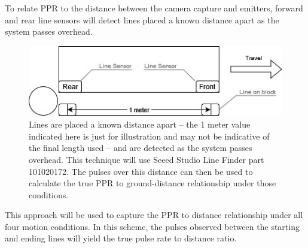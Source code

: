 \documentclass[12pt]{article}
\begin{document}
To relate PPR to the distance between the camera capture and emitters, forward and rear line sensors will detect lines placed a known distance apart as the system passes overhead.
\begin{figure}[H]
	\centering
	\includegraphics[width=0.75\linewidth]{./figures/determine-ppr-per-meter.jpg}
	\caption[Determine PPR per meter]{Lines are placed a known distance apart -- the 1 meter value indicated here is just for illustration and may not be indicative of the final length used -- and are detected as the system passes overhead. This technique will use Seeed Studio Line Finder part 101020172. The pulses over this distance can then be used to calculate the true PPR to ground-distance relationship under those conditions.}
	\label{fig:ppr-to-meter}
\end{figure}

This approach will be used to capture the PPR to distance relationship under all four motion conditions. In this scheme, the pulses observed between the starting and ending lines will yield the true pulse rate to distance ratio.
\end{document}
